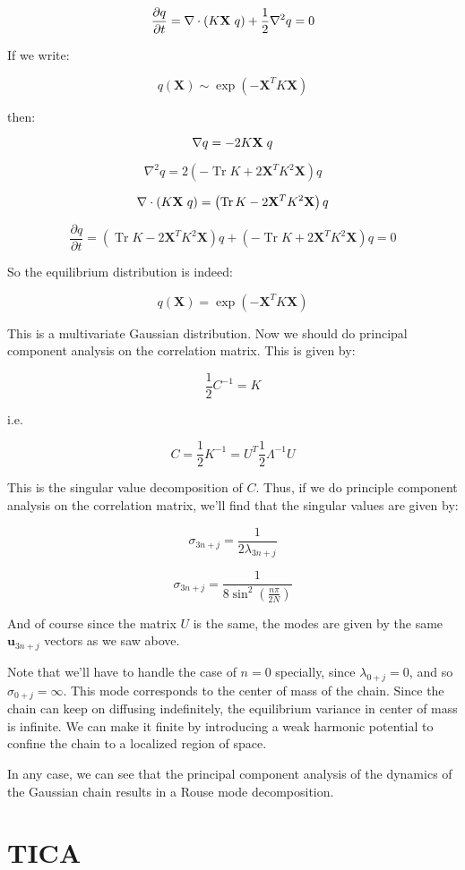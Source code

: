 \documentclass[]{scrartcl}
\newcommand{\p}[1]{\left( #1 \right)}
\newcommand{\w}[1]{\mathbf{#1}}
\newcommand{\parfr}[2]{\frac{\partial #1}{\partial #2}}
\newcommand{\h}{\hspace{0.3em}}
\DeclareMathOperator\Tr{Tr}
\begin{document}
$$
\parfr{q}{t} = \nabla\cdot\p{K\w{X}\h q} + \frac{1}{2}\nabla^2 q = 0
$$

If we write:

$$
q(\w{X}) \sim \exp\p{-\w{X}^T K \w{X}}
$$

then:

$$
\nabla q = -2K\w{X}\h q
$$

$$
\nabla^2 q = 2\p{-\Tr K + 2\w{X}^T K^2 \w{X}} q
$$

$$
\nabla\cdot\p{K\w{X}\h q} = \p{\Tr K -2\w{X}^TK^2\w{X}}q
$$

$$
\parfr{q}{t} = \p{\Tr K -2\w{X}^TK^2\w{X}} q + 
\p{-\Tr K + 2\w{X}^T K^2 \w{X}} q = 0
$$

So the equilibrium distribution is indeed:

$$
q(\w{X}) = \exp\p{-\w{X}^T K \w{X}}
$$

This is a multivariate Gaussian distribution. Now we should do principal component analysis on the correlation matrix. This is given by:

$$
\frac{1}{2}C^{-1} = K
$$

i.e.

$$
C = \frac{1}{2} K^{-1} = U^T \frac{1}{2}\Lambda^{-1} U
$$

This is the singular value decomposition of $C$. Thus, if we do principle component analysis on the correlation matrix, we'll find that the singular values are given by:

$$
\sigma_{3n + j} = \frac{1}{2\lambda_{3n + j}}
$$

$$
\sigma_{3n + j} = \frac{1}{8\sin^2\p{\frac{n\pi}{2N}}}
$$

And of course since the matrix $U$ is the same, the modes are given by the same $\w{u}_{3n+j}$ vectors as we saw above.

Note that we'll have to handle the case of $n=0$ specially, since $\lambda_{0+j} = 0$, and so $\sigma_{0+j}=\infty$. This mode corresponds to the center of mass of the chain. Since the chain can keep on diffusing indefinitely, the equilibrium variance in center of mass is infinite. We can make it finite by introducing a weak harmonic potential to confine the chain to a localized region of space.

In any case, we can see that the principal component analysis of the dynamics of the Gaussian chain results in a Rouse mode decomposition.

\section{TICA}
\end{document}
